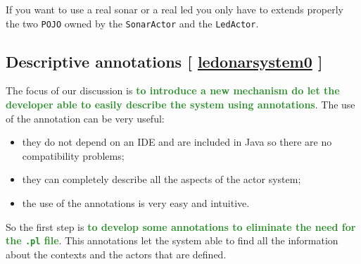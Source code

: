 If you want to use a real sonar or a real led you only have to extends properly the two \texttt{POJO} owned by the \texttt{SonarActor} and the \texttt{LedActor}.

\subsection{Descriptive annotations [ \href{https://github.com/LM-96/QA-Extensions/tree/main/it.unibo.ledsonardemo0}{\textcolor{Emerald}{\textbf{ledonarsystem0}}} ]}

The focus of our discussion is \textcolor{ForestGreen}{\textbf{to introduce a new mechanism do let the developer able to easily describe the system using annotations}}. The use of the annotation can be very useful:
\begin{itemize}
	\item they do not depend on an IDE and are included in Java so there are no compatibility problems;
	\item they can completely describe all the aspects of the actor system;
	\item the use of the annotations is very easy and intuitive.
\end{itemize}

So the first step is \textcolor{ForestGreen}{\textbf{to develop some annotations to eliminate the need for the \texttt{.pl} file}}. This annotations let the system able to find all the information about the contexts and the actors that are defined.

